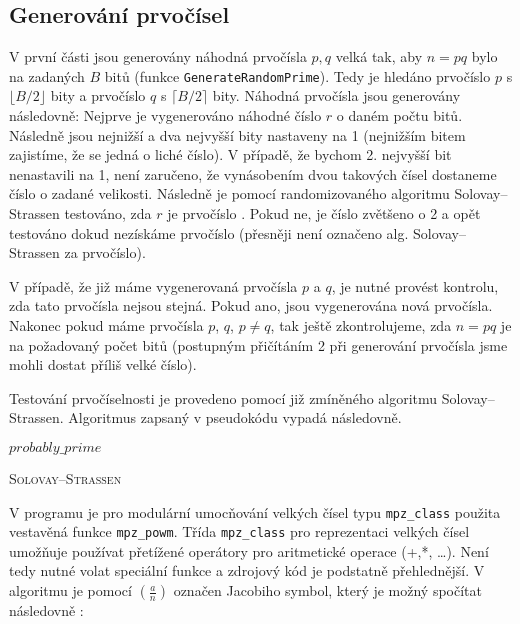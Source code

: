 \documentclass[a4paper,12pt]{article}
\begin{document}
\subsection{Generování prvočísel}
V první části jsou generovány náhodná prvočísla $p,q$ velká tak, aby $n = pq$ bylo na zadaných $B$ bitů (funkce \texttt{GenerateRandomPrime}).
Tedy je hledáno prvočíslo $p$ s $\lfloor B/2 \rfloor$ bity a prvočíslo $q$ s $\lceil B / 2 \rceil$ bity.
Náhodná prvočísla jsou generovány následovně: Nejprve je vygenerováno náhodné číslo $r$ o daném počtu bitů.
Následně jsou nejnižší a dva nejvyšší bity nastaveny na 1 (nejnižším bitem zajistíme, že se jedná o liché číslo).
V případě, že bychom 2. nejvyšší bit nenastavili na 1, není zaručeno, že vynásobením dvou takových čísel 
dostaneme číslo o zadané velikosti. Následně je pomocí randomizovaného algoritmu Solovay--Strassen
testováno, zda $r$ je prvočíslo \cite{nech}. Pokud ne, je číslo zvětšeno o 2 a opět testováno dokud nezískáme 
prvočíslo (přesněji není označeno alg. Solovay--Strassen za prvočíslo).

V případě, že již máme vygenerovaná prvočísla $p$ a $q$, je nutné provést kontrolu, zda tato prvočísla 
nejsou stejná. Pokud ano, jsou vygenerována nová prvočísla. Nakonec pokud máme prvočísla $p$, $q$, $p\neq q$,
tak ještě zkontrolujeme, zda $n = pq$ je na požadovaný počet bitů (postupným přičítáním 2 při generování
prvočísla jsme mohli dostat příliš velké číslo).

Testování prvočíselnosti je provedeno pomocí již zmíněného algoritmu Solovay--Strassen. Algoritmus
zapsaný v pseudokódu vypadá následovně.

\medskip
\begin{algorithm}[H]
 \SetNlSty{}{}{:}
 \SetNlSkip{-1.2em}
 \SetInd{1em}{1em}
 \BlankLine
 \Indentp{1.7em}
    \Return $probably\_prime$
 \caption{\textsc{Solovay--Strassen}}
 \label{fastSlam}
\end{algorithm}

\medskip
V programu je pro modulární umocňování velkých čísel typu \texttt{mpz\_class} použita vestavěná funkce \texttt{mpz\_powm}. 
Třída \texttt{mpz\_class} pro reprezentaci velkých čísel umožňuje používat přetížené operátory pro aritmetické operace (+,*, \dots).
Není tedy nutné volat speciální funkce a zdrojový kód je podstatně přehlednější.
V algoritmu je pomocí $(\frac{a}{n})$ označen Jacobiho symbol, který je možný spočítat následovně \cite{jac}:
\end{document}
